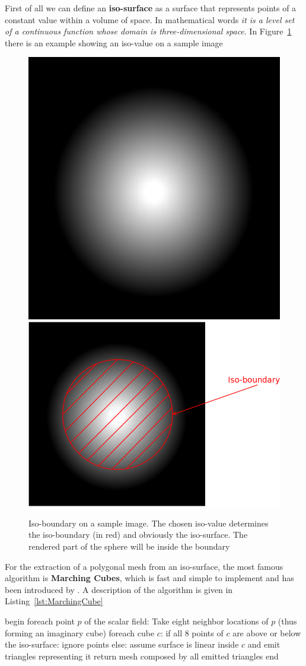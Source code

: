 First of all we can define an \textbf{iso-surface} as a surface that represents points of a constant value within a volume of space. In mathematical words \textit{it is a level set of a continuous function whose domain is three-dimensional space}. In Figure~\ref{fig:isosurface} there is an example showing an iso-value on a sample image

\begin{figure}[htb] %
   \centering
   \includegraphics[width=0.35\linewidth]{images/isosurface0.png}
   \includegraphics[width=0.45\linewidth]{images/isosurface1.png}
   \caption[Iso-boundary on a sample image]{Iso-boundary on a sample image. The chosen iso-value determines the iso-boundary (in red) and obviously the iso-surface. The rendered part of the sphere will be inside the boundary}
   \label{fig:isosurface}
\end{figure}

For the extraction of a polygonal mesh from an iso-surface, the most famous algorithm is \textbf{Marching Cubes}, which is fast and simple to implement and has been introduced by \cite{Lorensen}. A description of the algorithm is given in Listing~\ref{lst:MarchingCube}


\begin{pseudo}[caption={Marching Cube algorithm}, label={lst:MarchingCube}]
begin
 foreach point $p$ of the scalar field:
   Take eight neighbor locations of $p$ (thus 
         forming an imaginary cube)
 foreach cube $c$:
   if all 8 points of $c$ are above or below the iso-surface:
     ignore points
   else:
     assume surface is linear inside $c$ and
           emit triangles representing it 
 return mesh composed by all emitted triangles
end       
\end{pseudo}

